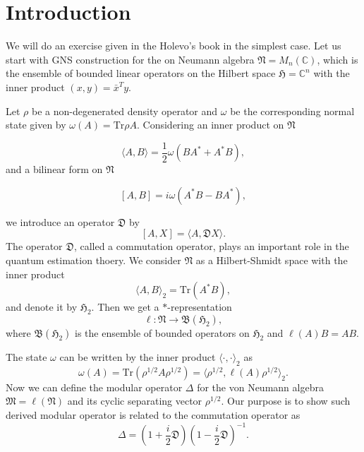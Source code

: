 \section{Introduction}
We will do an exercise given in the Holevo's book in the simplest case. 
Let us start with GNS construction for the 
on Neumann algebra $\mathfrak{N}=M_n(\mathbb{C})$, which is the ensemble of bounded linear operators on 
the Hilbert space $\mathfrak{H}=\mathbb{C}^n$ with the inner product $(x,y)=\bar{x}^Ty$. 

Let $\rho$ be a non-degenerated density operator and 
$\omega$ be the corresponding normal state given by $\omega(A)=\mbox{Tr}\rho A$.
Considering an inner product on $\mathfrak{N}$

\begin{equation}
\label{innerP}
\langle A, B \rangle =\frac{1}{2}\omega(BA^{\ast}+A^{\ast}B),
\end{equation}
and a bilinear form on $\mathfrak{N}$

$$
[A,B]=i\omega(A^{\ast}B-BA^{\ast}),
$$

we introduce an operator $\mathfrak{D}$ by 
$$
[A,X]=\langle A, \mathfrak{D}X\rangle.
$$
The operator $\mathfrak{D}$, called a commutation operator, plays an important role in the quantum estimation thoery.
We consider $\mathfrak{N}$ as a Hilbert-Shmidt space with the inner product
$$
\langle A, B \rangle_2 =\mbox{Tr}(A^{\ast}B),
$$
and denote it by $\mathfrak{H}_2$.
Then we get a $\ast$-representation 
$$
\ell :\mathfrak{N}\to \mathfrak{B}(\mathfrak{H}_2),
$$
where $\mathfrak{B}(\mathfrak{H}_2)$ is the ensemble of bounded operators on $\mathfrak{H}_2$
and $\ell(A)B=AB$.

The state $\omega$ can be written by the inner product $\langle \cdot, \cdot\rangle_2$ as 
$$
\omega(A)=\mbox{Tr}(\rho^{1/2}A\rho^{1/2})=\langle \rho^{1/2},\ell(A)\rho^{1/2}\rangle_2 .
$$
Now we can define the modular operator $\Delta$ for the von Neumann algebra $\mathfrak{M}=\ell(\mathfrak{N})$ and its cyclic separating vector $\rho^{1/2}$. 
Our purpose is to show such derived modular operator is related to the commutation operator
as
$$
    \Delta=\left(1+\frac{i}{2}\mathfrak{D}\right)\left(1-\frac{i}{2}\mathfrak{D}\right)^{-1}.
$$
